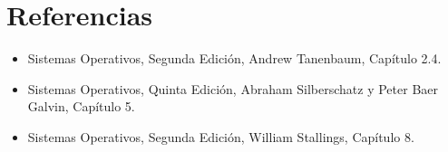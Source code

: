 \section{Referencias}
\begin{itemize}
\item Sistemas Operativos, Segunda Edición, Andrew Tanenbaum, Capítulo 2.4.
\item Sistemas Operativos, Quinta Edición, Abraham Silberschatz y Peter Baer
Galvin, Capítulo 5.
\item Sistemas Operativos, Segunda Edición, William Stallings, Capítulo 8.
\end{itemize}
